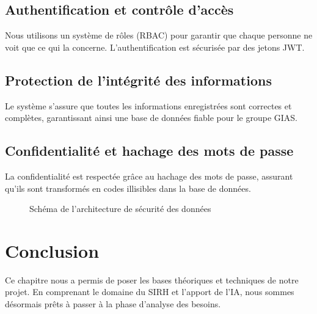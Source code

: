 \subsection{Authentification et contrôle d'accès}
Nous utilisons un système de rôles (RBAC) pour garantir que chaque personne ne voit que ce qui la concerne. L'authentification est sécurisée par des jetons JWT.

\subsection{Protection de l'intégrité des informations}
Le système s'assure que toutes les informations enregistrées sont correctes et complètes, garantissant ainsi une base de données fiable pour le groupe GIAS.

\subsection{Confidentialité et hachage des mots de passe}
La confidentialité est respectée grâce au hachage des mots de passe, assurant qu'ils sont transformés en codes illisibles dans la base de données.

\begin{figure}[H]
    \centering
    \caption{Schéma de l'architecture de sécurité des données}
\end{figure}

\section{Conclusion}
Ce chapitre nous a permis de poser les bases théoriques et techniques de notre projet. En comprenant le domaine du SIRH et l'apport de l'IA, nous sommes désormais prêts à passer à la phase d'analyse des besoins.
